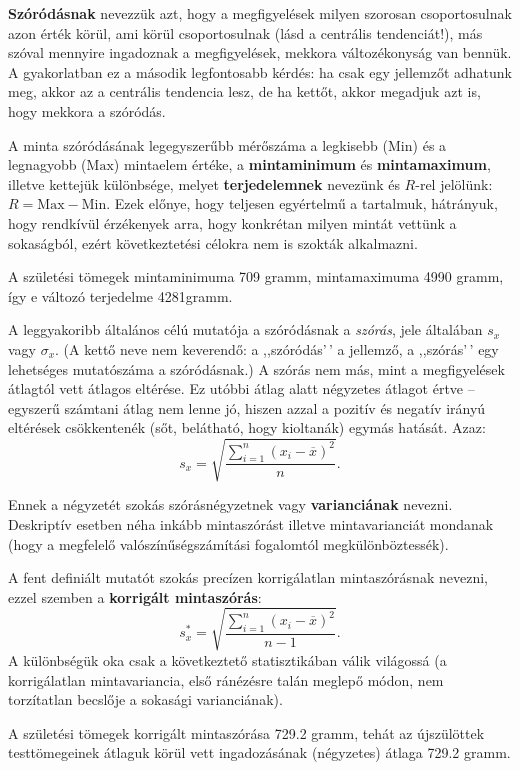\documentclass[
]{book}
\begin{document}
\textbf{Szóródásnak} nevezzük azt, hogy a megfigyelések milyen szorosan csoportosulnak azon érték körül, ami körül csoportosulnak (lásd a centrális tendenciát!), más szóval mennyire ingadoznak a megfigyelések, mekkora változékonyság van bennük. A gyakorlatban ez a második legfontosabb kérdés: ha csak egy jellemzőt adhatunk meg, akkor az a centrális tendencia lesz, de ha kettőt, akkor megadjuk azt is, hogy mekkora a szóródás.

A minta szóródásának legegyszerűbb mérőszáma a legkisebb (\(\mathrm{Min}\)) és a legnagyobb (\(\mathrm{Max}\)) mintaelem értéke, a \textbf{mintaminimum} és \textbf{mintamaximum}, illetve kettejük különbsége, melyet \textbf{terjedelemnek} nevezünk és \(R\)-rel jelölünk: \(R=\mathrm{Max}-\mathrm{Min}\). Ezek előnye, hogy teljesen egyértelmű a tartalmuk, hátrányuk, hogy rendkívül érzékenyek arra, hogy konkrétan milyen mintát vettünk a sokaságból, ezért következtetési célokra nem is szokták alkalmazni.

A születési tömegek mintaminimuma 709 gramm, mintamaximuma 4990 gramm, így e változó terjedelme 4281gramm.

A leggyakoribb általános célú mutatója a szóródásnak a \emph{szórás}, jele általában \(s_x\) vagy \(\sigma_x\). (A kettő neve nem keverendő: a ,,szóródás'\,' a jellemző, a ,,szórás'\,' egy lehetséges mutatószáma a szóródásnak.) A szórás nem más, mint a megfigyelések átlagtól vett átlagos eltérése. Ez utóbbi átlag alatt négyzetes átlagot értve -- egyszerű számtani átlag nem lenne jó, hiszen azzal a pozitív és negatív irányú eltérések csökkentenék (sőt, belátható, hogy kioltanák) egymás hatását. Azaz:
\[
    s_x=\sqrt{\frac{\sum_{i=1}^n \left(x_i-\overline{x}\right)^2}{n}}.
\]

Ennek a négyzetét szokás szórásnégyzetnek vagy \textbf{varianciának} nevezni. Deskriptív esetben néha inkább mintaszórást illetve mintavarianciát mondanak (hogy a megfelelő valószínűségszámítási fogalomtól megkülönböztessék).

A fent definiált mutatót szokás precízen korrigálatlan mintaszórásnak nevezni, ezzel szemben a \textbf{korrigált mintaszórás}:
\[
    s_x^{\ast}=\sqrt{\frac{\sum_{i=1}^n \left(x_i-\overline{x}\right)^2}{n-1}}.
\]
A különbségük oka csak a következtető statisztikában válik világossá (a korrigálatlan mintavariancia, első ránézésre talán meglepő módon, nem torzítatlan becslője a sokasági varianciának).

A születési tömegek korrigált mintaszórása 729.2 gramm, tehát az újszülöttek testtömegeinek átlaguk körül vett ingadozásának (négyzetes) átlaga 729.2 gramm.
\end{document}
